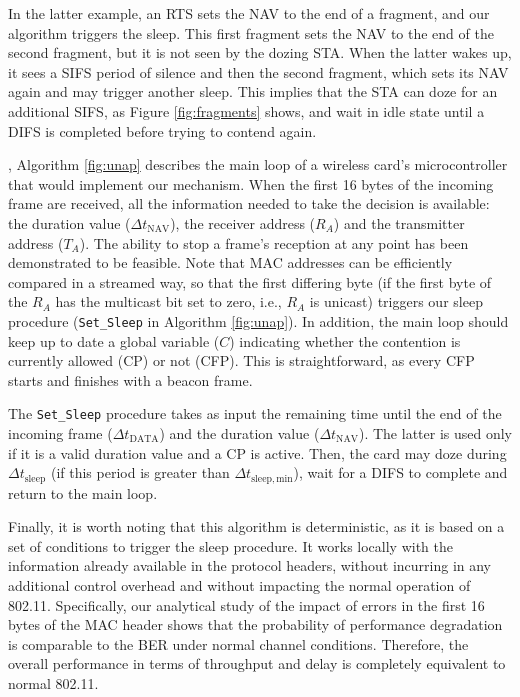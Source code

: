 \documentclass[twoside,nohyper]{tufte-book}
\begin{document}
In the latter example, an RTS sets the NAV to the end of a fragment, and our algorithm triggers the sleep. This first fragment sets the NAV to the end of the second fragment, but it is not seen by the dozing STA. When the latter wakes up, it sees a SIFS period of silence and then the second fragment, which sets its NAV again and may trigger another sleep. This implies that the STA can doze for an additional SIFS, as Figure \ref{fig:fragments} shows, and wait in idle state until a DIFS is completed before trying to contend again.

, Algorithm \ref{fig:unap} describes the main loop of a wireless card's microcontroller that would implement our mechanism. When the first 16 bytes of the incoming frame are received, all the information needed to take the decision is available: the duration value (\(\Delta t_\mathrm{NAV}\)), the receiver address (\(R_A\)) and the transmitter address (\(T_A\)). The ability to stop a frame's reception at any point has been demonstrated to be feasible\cite[0pt]{berger2014}. Note that MAC addresses can be efficiently compared in a streamed way, so that the first differing byte (if the first byte of the \(R_A\) has the multicast bit set to zero, i.e., \(R_A\) is unicast) triggers our sleep procedure (\texttt{Set\_Sleep} in Algorithm \ref{fig:unap}). In addition, the main loop should keep up to date a global variable (\(C\)) indicating whether the contention is currently allowed (CP) or not (CFP). This is straightforward, as every CFP starts and finishes with a beacon frame.

The \texttt{Set\_Sleep} procedure takes as input the remaining time until the end of the incoming frame (\(\Delta t_\mathrm{DATA}\)) and the duration value (\(\Delta t_\mathrm{NAV}\)). The latter is used only if it is a valid duration value and a CP is active. Then, the card may doze during \(\Delta t_\mathrm{sleep}\) (if this period is greater than \(\Delta t_\mathrm{sleep,min}\)), wait for a DIFS to complete and return to the main loop.

Finally, it is worth noting that this algorithm is deterministic, as it is based on a set of conditions to trigger the sleep procedure. It works locally with the information already available in the protocol headers, without incurring in any additional control overhead and without impacting the normal operation of 802.11. Specifically, our analytical study of the impact of errors in the first 16 bytes of the MAC header shows that the probability of performance degradation is comparable to the BER under normal channel conditions. Therefore, the overall performance in terms of throughput and delay is completely equivalent to normal 802.11.
\end{document}
